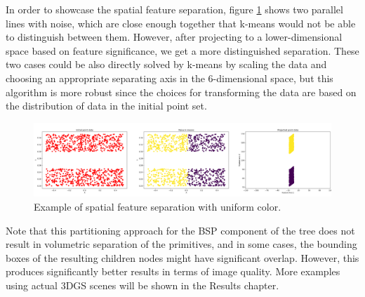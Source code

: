In order to showcase the spatial feature separation, figure \ref{fig:cluster_space} shows two parallel lines with noise, which are close enough together that k-means would not be able to distinguish between them. However, after projecting to a lower-dimensional space based on feature significance, we get a more distinguished separation. These two cases could be also directly solved by k-means by scaling the data and choosing an appropriate separating axis in the 6-dimensional space, but this algorithm is more robust since the choices for transforming the data are based on the distribution of data in the initial point set. 

\begin{figure}[H]
    \centering
    \includegraphics[width=\linewidth]{figures/clustering_space.png}
    \caption{Example of spatial feature separation with uniform color.}
    \label{fig:cluster_space}
\end{figure}

Note that this partitioning approach for the BSP component of the tree does not result in volumetric separation of the primitives, and in some cases, the bounding boxes of the resulting children nodes might have significant overlap. However, this produces significantly better results in terms of image quality. More examples using actual 3DGS scenes will be shown in the Results chapter. 